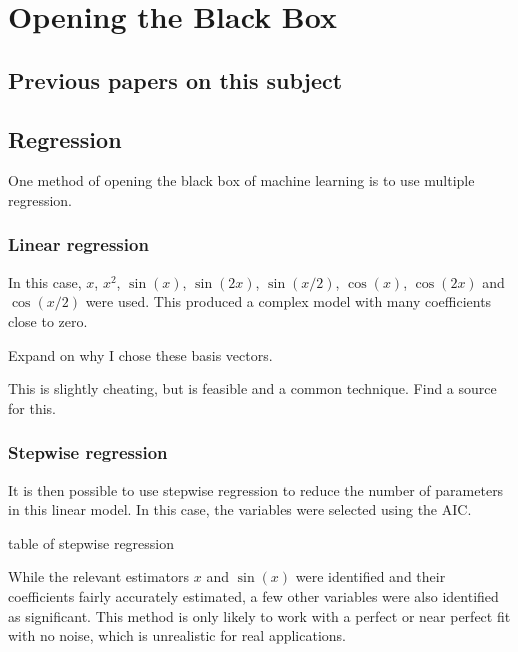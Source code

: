 
\chapter{Opening the Black Box}

\section{Previous papers on this subject}

\section{Regression}

One method of opening the black box of machine learning is to use multiple regression.

\subsection{Linear regression}

In this case, \(x\), \(x^2\), \(\sin(x)\), \(\sin(2x)\), \(\sin(x/2)\), \(\cos(x)\), \(\cos(2x)\) and \(\cos(x/2)\) were used.
This produced a complex model with many coefficients close to zero.

\begin{todo}
	Expand on why I chose these basis vectors.
\end{todo}


\begin{todo}
	This is slightly cheating, but is feasible and a common technique. Find a source for this.
\end{todo}

\subsection{Stepwise regression}

It is then possible to use stepwise regression to reduce the number of parameters in this linear model.
In this case, the variables were selected using the \ac{AIC}.

\begin{todo}
	table of stepwise regression
\end{todo}

While the relevant estimators \(x\) and \(\sin(x)\) were identified and their coefficients fairly accurately estimated, a few other variables were also identified as significant.
This method is only likely to work with a perfect or near perfect fit with no noise, which is unrealistic for real applications.

